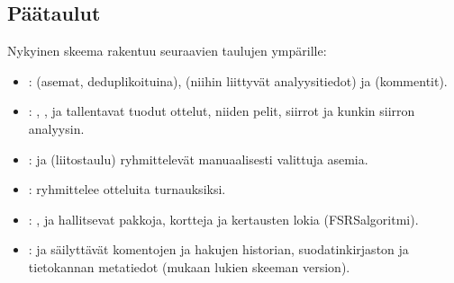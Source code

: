 \documentclass[letterpaper,10pt,finnish]{sphinxmanual}
\begin{document}
\subsection{Päätaulut}
\label{\detokenize{annexe_db_scheme:principales-tables}}
\sphinxAtStartPar
Nykyinen skeema rakentuu seuraavien taulujen ympärille:
\begin{itemize}
\item {} 
\sphinxAtStartPar
{}:  (asemat, deduplikoituina),  (niihin liittyvät analyysitiedot) ja  (kommentit).

\item {} 
\sphinxAtStartPar
{}: , ,  ja  tallentavat tuodut ottelut, niiden pelit, siirrot ja kunkin siirron analyysin.

\item {} 
\sphinxAtStartPar
{}:  ja  (liitostaulu) ryhmittelevät manuaalisesti valittuja asemia.

\item {} 
\sphinxAtStartPar
{}:  ryhmittelee otteluita turnauksiksi.

\item {} 
\sphinxAtStartPar
{}: ,  ja  hallitsevat pakkoja, kortteja ja kertausten lokia (FSRS\sphinxhyphen{}algoritmi).

\item {} 
\sphinxAtStartPar
{}:  ja  säilyttävät komentojen ja hakujen historian,  suodatinkirjaston ja  tietokannan metatiedot (mukaan lukien skeeman version).

\end{itemize}
\end{document}
